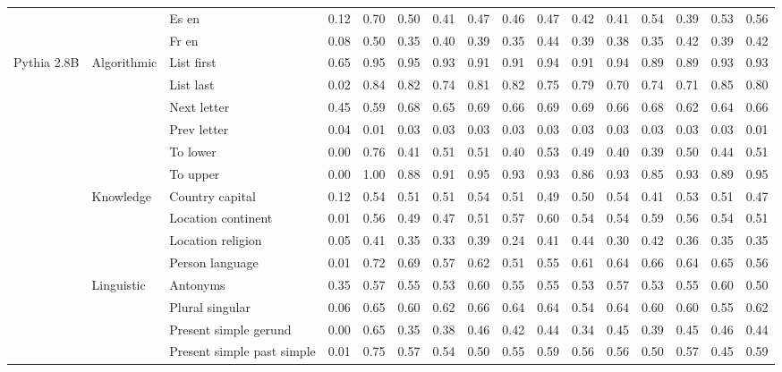 \begin{center}
\begin{longtable}{lllrrrrrrrrrrrrr}
 &  & Es en & 0.12 & 0.70 & 0.50 & 0.41 & 0.47 & 0.46 & 0.47 & 0.42 & 0.41 & 0.54 & 0.39 & 0.53 & 0.56 \\
 &  & Fr en & 0.08 & 0.50 & 0.35 & 0.40 & 0.39 & 0.35 & 0.44 & 0.39 & 0.38 & 0.35 & 0.42 & 0.39 & 0.42 \\
\cline{1-16} \cline{2-16}
\multirow[t]{18}{*}{Pythia 2.8B} & \multirow[t]{6}{*}{Algorithmic} & List first & 0.65 & 0.95 & 0.95 & 0.93 & 0.91 & 0.91 & 0.94 & 0.91 & 0.94 & 0.89 & 0.89 & 0.93 & 0.93 \\
 &  & List last & 0.02 & 0.84 & 0.82 & 0.74 & 0.81 & 0.82 & 0.75 & 0.79 & 0.70 & 0.74 & 0.71 & 0.85 & 0.80 \\
 &  & Next letter & 0.45 & 0.59 & 0.68 & 0.65 & 0.69 & 0.66 & 0.69 & 0.69 & 0.66 & 0.68 & 0.62 & 0.64 & 0.66 \\
 &  & Prev letter & 0.04 & 0.01 & 0.03 & 0.03 & 0.03 & 0.03 & 0.03 & 0.03 & 0.03 & 0.03 & 0.03 & 0.03 & 0.01 \\
 &  & To lower & 0.00 & 0.76 & 0.41 & 0.51 & 0.51 & 0.40 & 0.53 & 0.49 & 0.40 & 0.39 & 0.50 & 0.44 & 0.51 \\
 &  & To upper & 0.00 & 1.00 & 0.88 & 0.91 & 0.95 & 0.93 & 0.93 & 0.86 & 0.93 & 0.85 & 0.93 & 0.89 & 0.95 \\
\cline{2-16}
 & \multirow[t]{4}{*}{Knowledge} & Country capital & 0.12 & 0.54 & 0.51 & 0.51 & 0.54 & 0.51 & 0.49 & 0.50 & 0.54 & 0.41 & 0.53 & 0.51 & 0.47 \\
 &  & Location continent & 0.01 & 0.56 & 0.49 & 0.47 & 0.51 & 0.57 & 0.60 & 0.54 & 0.54 & 0.59 & 0.56 & 0.54 & 0.51 \\
 &  & Location religion & 0.05 & 0.41 & 0.35 & 0.33 & 0.39 & 0.24 & 0.41 & 0.44 & 0.30 & 0.42 & 0.36 & 0.35 & 0.35 \\
 &  & Person language & 0.01 & 0.72 & 0.69 & 0.57 & 0.62 & 0.51 & 0.55 & 0.61 & 0.64 & 0.66 & 0.64 & 0.65 & 0.56 \\
\cline{2-16}
 & \multirow[t]{4}{*}{Linguistic} & Antonyms & 0.35 & 0.57 & 0.55 & 0.53 & 0.60 & 0.55 & 0.55 & 0.53 & 0.57 & 0.53 & 0.55 & 0.60 & 0.50 \\
 &  & Plural singular & 0.06 & 0.65 & 0.60 & 0.62 & 0.66 & 0.64 & 0.64 & 0.54 & 0.64 & 0.60 & 0.60 & 0.55 & 0.62 \\
 &  & Present simple gerund & 0.00 & 0.65 & 0.35 & 0.38 & 0.46 & 0.42 & 0.44 & 0.34 & 0.45 & 0.39 & 0.45 & 0.46 & 0.44 \\
 &  & Present simple past simple & 0.01 & 0.75 & 0.57 & 0.54 & 0.50 & 0.55 & 0.59 & 0.56 & 0.56 & 0.50 & 0.57 & 0.45 & 0.59 \\

\end{longtable}
\end{center}
